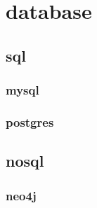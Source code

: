 \chapter{database}
\section{sql}
\subsection{mysql}
\subsection{postgres}
\section{nosql}

\subsection{neo4j}

